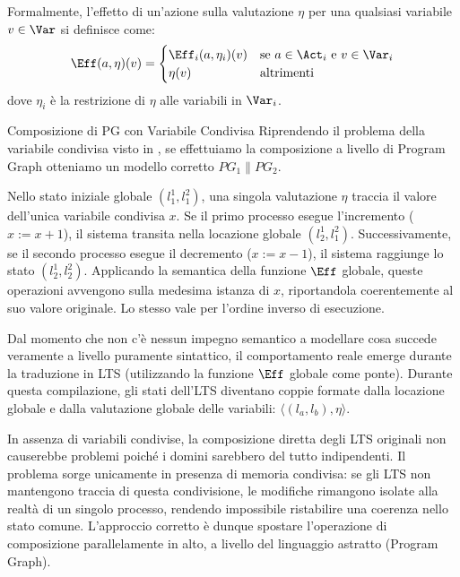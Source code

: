 Formalmente, l'effetto di un'azione sulla valutazione \(\eta\) per una qualsiasi variabile \(v \in \Var\) si definisce come:
\[
  \Eff(a, \eta)(v) =
  \begin{cases}
    \Eff_i(a, \eta_i)(v) & \text{se } a \in \Act_i \text{ e } v \in \Var_i \\
    \eta(v)              & \text{altrimenti}
  \end{cases}
\]
dove \(\eta_i\) è la restrizione di \(\eta\) alle variabili in \(\Var_i\).


\begin{example}{Composizione di PG con Variabile Condivisa}
  Riprendendo il problema della variabile condivisa visto in , se effettuiamo la composizione a livello di Program Graph otteniamo un modello corretto \(PG_1 \parallel PG_2\).

  Nello stato iniziale globale \((l_1^1, l_1^2)\), una singola valutazione \(\eta\) traccia il valore dell'unica variabile condivisa \(x\).
  Se il primo processo esegue l'incremento (\(x := x+1\)), il sistema transita nella locazione globale \((l_2^1, l_1^2)\). Successivamente, se il secondo processo esegue il decremento (\(x := x-1\)), il sistema raggiunge lo stato \((l_2^1, l_2^2)\). Applicando la semantica della funzione \(\Eff\) globale, queste operazioni avvengono sulla medesima istanza di \(x\), riportandola coerentemente al suo valore originale. Lo stesso vale per l'ordine inverso di esecuzione.
\end{example}

Dal momento che non c'è nessun impegno semantico a modellare cosa succede veramente a livello puramente sintattico, il comportamento reale emerge durante la traduzione in LTS (utilizzando la funzione \(\Eff\) globale come ponte).
Durante questa compilazione, gli stati dell'LTS diventano coppie formate dalla locazione globale e dalla valutazione globale delle variabili: \(\langle (l_a, l_b), \eta \rangle\).

In assenza di variabili condivise, la composizione diretta degli LTS originali non causerebbe problemi poiché i domini sarebbero del tutto indipendenti. Il problema sorge unicamente in presenza di memoria condivisa: se gli LTS non mantengono traccia di questa condivisione, le modifiche rimangono isolate alla realtà di un singolo processo, rendendo impossibile ristabilire una coerenza nello stato comune. L'approccio corretto è dunque spostare l'operazione di composizione parallelamente in alto, a livello del linguaggio astratto (Program Graph).


